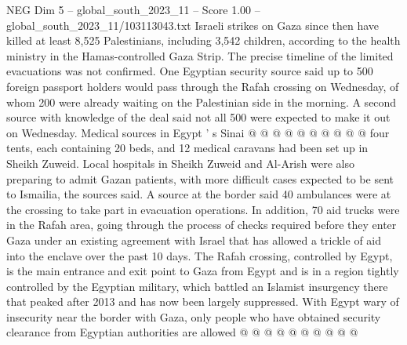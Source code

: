 \begin{textsample}{NEG Dim 5 – global\_south\_2023\_11 – Score 1.00 – global\_south\_2023\_11/103113043.txt}
Israeli strikes on Gaza since then have killed at least 8,525 Palestinians, including 3,542 children, according to the health ministry in the Hamas-controlled Gaza Strip.
The precise timeline of the limited evacuations was not confirmed.
One Egyptian security source said up to 500 foreign passport holders would pass through the Rafah crossing on Wednesday, of whom 200 were already waiting on the Palestinian side in the morning.
A second source with knowledge of the deal said not all 500 were expected to make it out on Wednesday.
Medical sources in Egypt ' s Sinai @ @ @ @ @ @ @ @ @ @ four tents, each containing 20 beds, and 12 medical caravans had been set up in Sheikh Zuweid.
Local hospitals in Sheikh Zuweid and Al-Arish were also preparing to admit Gazan patients, with more difficult cases expected to be sent to Ismailia, the sources said.
A source at the border said 40 ambulances were at the crossing to take part in evacuation operations.
In addition, 70 aid trucks were in the Rafah area, going through the process of checks required before they enter Gaza under an existing agreement with Israel that has allowed a trickle of aid into the enclave over the past 10 days.
The Rafah crossing, controlled by Egypt, is the main entrance and exit point to Gaza from Egypt and is in a region tightly controlled by the Egyptian military, which battled an Islamist insurgency there that peaked after 2013 and has now been largely suppressed.
With Egypt wary of insecurity near the border with Gaza, only people who have obtained security clearance from Egyptian authorities are allowed @ @ @ @ @ @ @ @ @ @

\end{textsample}
